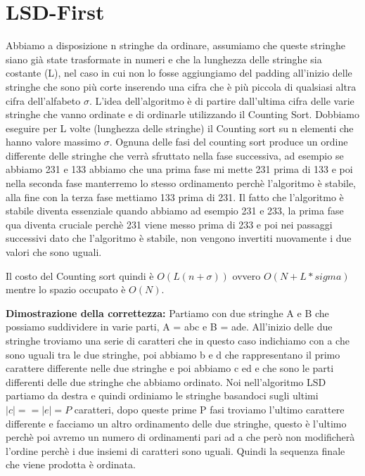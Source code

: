 \documentclass[14pt]{extreport}
\begin{document}
\section{LSD-First}

Abbiamo a disposizione n stringhe da ordinare, assumiamo che queste stringhe siano già state trasformate in numeri e che la lunghezza delle stringhe sia costante (L), nel caso in cui non lo fosse aggiungiamo del padding all'inizio delle stringhe che sono più corte inserendo una cifra che è più piccola di qualsiasi altra cifra dell'alfabeto $\sigma$.
L'idea dell'algoritmo è di partire dall'ultima cifra delle varie stringhe che vanno ordinate e di ordinarle utilizzando il Counting Sort. Dobbiamo eseguire per L volte (lunghezza delle stringhe) il Counting sort su n elementi che hanno valore massimo $\sigma$. Ognuna delle fasi del counting sort produce un ordine differente delle stringhe che verrà sfruttato nella fase successiva, ad esempio se abbiamo 231 e 133 abbiamo che una prima fase mi mette 231 prima di 133 e poi nella seconda fase manterremo lo stesso ordinamento perchè l'algoritmo è stabile, alla fine con la terza fase mettiamo 133 prima di 231. Il fatto che l'algoritmo è stabile diventa essenziale quando abbiamo ad esempio 231 e 233, la prima fase qua diventa cruciale perchè 231 viene messo prima di 233 e poi nei passaggi successivi dato che l'algoritmo è stabile, non vengono invertiti nuovamente i due valori che sono uguali.

Il costo del Counting sort quindi è $O(L(n+\sigma))$ ovvero $O(N+L*sigma)$ mentre lo spazio occupato è $O(N)$.

\textbf{Dimostrazione della correttezza:} Partiamo con due stringhe A e B che possiamo suddividere in varie parti, A = abc e B = ade.
All'inizio delle due stringhe troviamo una serie di caratteri che in questo caso indichiamo con a che sono uguali tra le due stringhe, poi abbiamo b e d che rappresentano il primo carattere differente nelle due stringhe e poi abbiamo c ed e che sono le parti differenti delle due stringhe che abbiamo ordinato.
Noi nell'algoritmo LSD partiamo da destra e quindi ordiniamo le stringhe basandoci sugli ultimi $|c| == |e| = P$ caratteri, dopo queste prime P fasi troviamo l'ultimo carattere differente e facciamo un altro ordinamento delle due stringhe, questo è l'ultimo perchè poi avremo un numero di ordinamenti pari ad a che però non modificherà l'ordine perchè i due insiemi di caratteri sono uguali. Quindi la sequenza finale che viene prodotta è ordinata.
\end{document}
